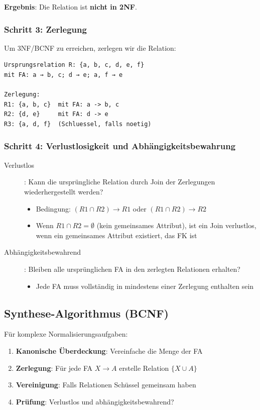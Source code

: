 \documentclass[a4paper]{article}
\begin{document}
\textbf{Ergebnis}: Die Relation ist \textbf{nicht in 2NF}.

\subsubsection{Schritt 3: Zerlegung}

Um 3NF/BCNF zu erreichen, zerlegen wir die Relation:

\begin{lstlisting}
Ursprungsrelation R: {a, b, c, d, e, f}
mit FA: a → b, c; d → e; a, f → e

Zerlegung:
R1: {a, b, c}  mit FA: a -> b, c
R2: {d, e}     mit FA: d -> e
R3: {a, d, f}  (Schluessel, falls noetig)
\end{lstlisting}

\subsubsection{Schritt 4: Verlustlosigkeit und Abhängigkeitsbewahrung}

\begin{description}
    \item[Verlustlos]: Kann die ursprüngliche Relation durch Join der Zerlegungen wiederhergestellt werden?
    \begin{itemize}
        \item Bedingung: $(R1 \cap R2) \to R1$ oder $(R1 \cap R2) \to R2$
        \item Wenn $R1 \cap R2 = \emptyset$ (kein gemeinsames Attribut), ist ein Join verlustlos, 
        wenn ein gemeinsames Attribut existiert, das FK ist
    \end{itemize}
    
    \item[Abhängigkeitsbewahrend]: Bleiben alle ursprünglichen FA in den zerlegten Relationen erhalten?
    \begin{itemize}
        \item Jede FA muss vollständig in mindestens einer Zerlegung enthalten sein
    \end{itemize}
\end{description}

\subsection{Synthese-Algorithmus (BCNF)}

Für komplexe Normalisierungsaufgaben:

\begin{enumerate}
    \item \textbf{Kanonische Überdeckung}: Vereinfache die Menge der FA
    \item \textbf{Zerlegung}: Für jede FA $X \to A$ erstelle Relation $\{X \cup A\}$
    \item \textbf{Vereinigung}: Falls Relationen Schüssel gemeinsam haben
    \item \textbf{Prüfung}: Verlustlos und abhängigkeitsbewahrend?
\end{enumerate}
\end{document}
